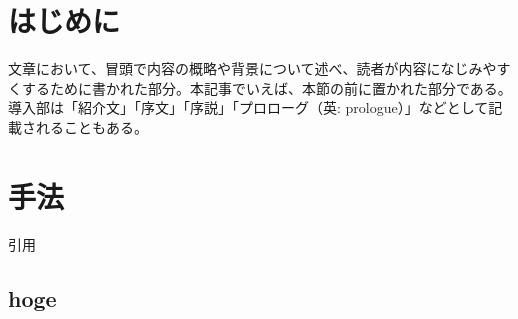 \documentclass{jsarticle}
\begin{document}
   \begin{multicols}{2}
      \newpage
      \section{はじめに}
      文章において、冒頭で内容の概略や背景について述べ、読者が内容になじみやすくするために書かれた部分。本記事でいえば、本節の前に置かれた部分である。導入部は「紹介文」「序文」「序説」「プロローグ（英: prologue）」などとして記載されることもある。\cite{intro}
      \section{手法}
      引用\cite{inyo}
      \subsection{hoge}

\end{multicols}
\end{document}
